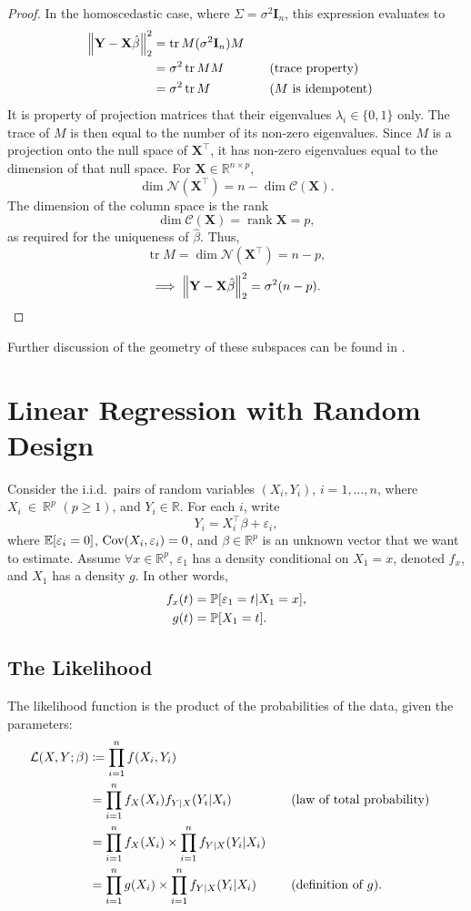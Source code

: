 \documentclass[letterpaper, reqno]{amsart}
\numberwithin{equation}{section}
\DeclarePairedDelimiter{\norm}{\lVert}{\rVert}
\newcommand{\T}{\top} %
\newcommand{\vect}[1]{\boldsymbol{\mathbf{#1}}} %
\newcommand{\Prob}[1]{\mathbb{P}\mleft[#1\mright]}
\newcommand{\E}[1]{\mathbb{E}\mleft[#1\mright]}
\newcommand{\Cov}[1]{\operatorname{Cov}\mleft(#1\mright)}
\newcommand{\Li}[1]{\mathcal{L}\mleft( #1 \mright)}  %
\newcommand{\R}{\mathbb{R}}  %
\newcommand{\iid}{i.i.d.}
\newcommand{\by}[1]{&\quad&\text{(#1)}}
\newcommand{\Xm}{\vect{X}}
\newcommand{\Yv}{\vect{Y}}
\newcommand{\Bv}{\beta}
\newcommand{\Bvh}{\hat{\beta}}
\newcommand{\ve}{\varepsilon}
\DeclareMathOperator{\tr}{tr}
\DeclareMathOperator{\rank}{rank}
\begin{document}
\begin{proof}
  In the homoscedastic case, where $\Sigma = \sigma^2 \vect{I}_n$, this expression
  evaluates to 
  \begin{alignat*}{3}
    \norm*{\Yv - \Xm\Bvh}_2^2 &= \tr M(\sigma^2 \vect{I}_n) M \\
    &= \sigma^2 \tr M M \by{trace property} \\
    &= \sigma^2 \tr M \by {$M$ is idempotent}
  \end{alignat*}
  It is property of projection matrices that their eigenvalues $\lambda_i \in
  \{0, 1\}$ only.
  The trace of $M$ is then equal to the number of its non-zero eigenvalues.
  Since $M$ is a projection onto the null space of $\Xm^\T$, it has non-zero
  eigenvalues equal to the dimension of that null space.
  For $\Xm \in \R^{n \times p}$,
  \[ \dim\mathscr{N}(\Xm^\T) = n - \dim \mathscr{C}(\Xm). \]
  The dimension of the column space is the rank
  \[ \dim \mathscr{C}(\Xm) = \rank \Xm = p, \]
  as required for the uniqueness of $\Bvh$. Thus,
  \[ \tr M = \dim\mathscr{N}(\Xm^\T) = n - p, \]
  \[ \implies \norm*{\Yv - \Xm\Bvh}_2^2 = \sigma^2 (n - p). \qedhere \]
\end{proof}
Further discussion of the geometry of these subspaces can be found in
\cite{davidson2004econometric}.




\clearpage
\section{Linear Regression with Random Design}
Consider the \iid\ pairs of random variables $(X_i, Y_i)$, $i = 1, \dots, n$,
where $X_i~\in~\R^p$ $(p \ge 1)$, and $Y_i \in \R$. For each $i$, write
\[ Y_i = X_i^\T \Bv + \ve_i, \]
where $\E{\ve_i = 0}$, $\Cov{X_i, \ve_i} = 0$, and $\Bv \in \R^p$ is an unknown
vector that we want to estimate. Assume $\forall x \in \R^p$, $\ve_1$ has
a density conditional on $X_1 = x$, denoted $f_x$, and $X_1$ has a density $g$.
In other words,
\begin{align*}
  f_x(t) &= \Prob{\ve_1 = t | X_1 = x}, \\
  g(t) &= \Prob{X_1 = t}.
\end{align*}

\subsection{The Likelihood}
The likelihood function is the product of the probabilities of the data, given
the parameters:
\begin{alignat*}{3}
  \Li{X, Y; \Bv} &\coloneqq \prod_{i=1}^n f(X_i, Y_i) \\
  &= \prod_{i=1}^n f_X(X_i) f_{Y|X}(Y_i | X_i) \by{law of total probability} \\
  &= \prod_{i=1}^n f_X(X_i) \times \prod_{i=1}^n f_{Y|X}(Y_i | X_i) \\
  &= \prod_{i=1}^n g(X_i) \times \prod_{i=1}^n f_{Y|X}(Y_i | X_i) \by{definition of $g$}.
\end{alignat*}
\end{document}
